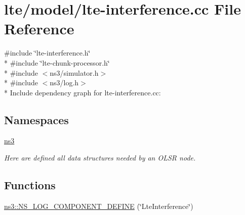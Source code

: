 \hypertarget{lte-interference_8cc}{}\section{lte/model/lte-\/interference.cc File Reference}
\label{lte-interference_8cc}
{\ttfamily \#include \char`\"{}lte-\/interference.\+h\char`\"{}}\\*
{\ttfamily \#include \char`\"{}lte-\/chunk-\/processor.\+h\char`\"{}}\\*
{\ttfamily \#include $<$ns3/simulator.\+h$>$}\\*
{\ttfamily \#include $<$ns3/log.\+h$>$}\\*
Include dependency graph for lte-\/interference.cc\+:
\subsection*{Namespaces}
\begin{DoxyCompactItemize}
\item 
 \hyperlink{namespacens3}{ns3}
\begin{DoxyCompactList}\small\item\em Here are defined all data structures needed by an O\+L\+SR node. \end{DoxyCompactList}\end{DoxyCompactItemize}
\subsection*{Functions}
\begin{DoxyCompactItemize}
\item 
\hyperlink{namespacens3_a109712363963b3f7f51374e68f721191}{ns3\+::\+N\+S\+\_\+\+L\+O\+G\+\_\+\+C\+O\+M\+P\+O\+N\+E\+N\+T\+\_\+\+D\+E\+F\+I\+NE} (\char`\"{}Lte\+Interference\char`\"{})
\end{DoxyCompactItemize}
